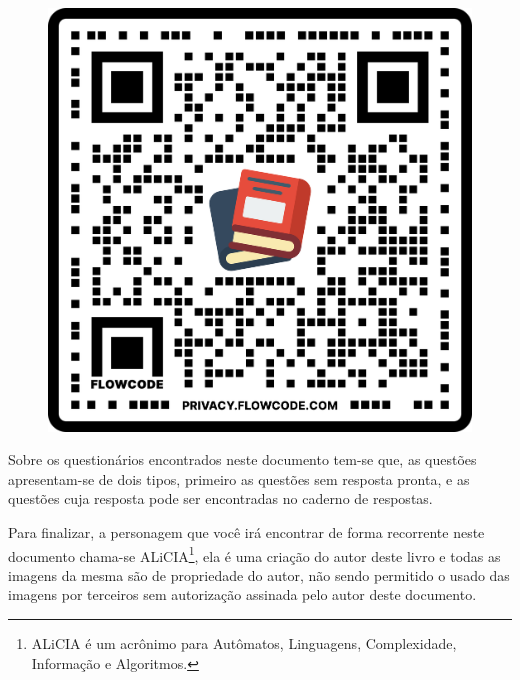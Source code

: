 \

\begin{figure}[h]
	\centering
	\includegraphics[width=0.2\linewidth]{fig/qrcode}
\end{figure}

Sobre os questionários encontrados neste documento tem-se que, as questões apresentam-se de dois tipos, primeiro as questões sem resposta pronta, e as questões cuja resposta pode ser encontradas no caderno de respostas.

Para finalizar, a personagem que você irá encontrar de forma recorrente neste documento chama-se ALiCIA\footnote{ALiCIA é um acrônimo para Autômatos, Linguagens, Complexidade, Informação e Algoritmos.}, ela é uma criação do autor deste livro e todas as imagens da mesma são de propriedade do autor, não sendo permitido o usado das imagens por terceiros sem autorização assinada pelo autor deste documento.

\endgroup
\newpage
